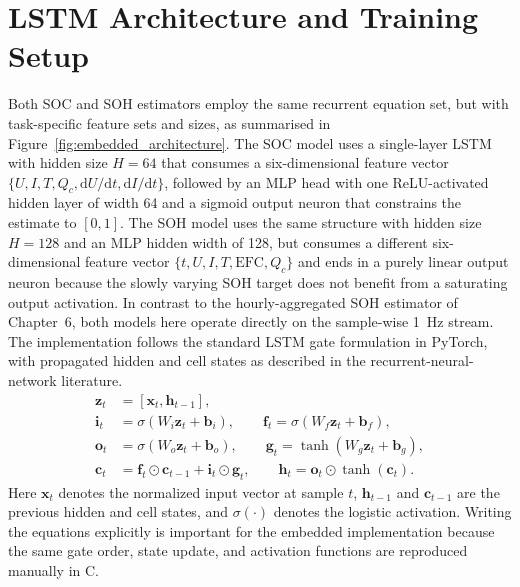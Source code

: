 \documentclass[
    a4paper,
    12pt,
    titlepage,
    bibliography=totoc,
    twoside=on,
    parskip=false,
    numbers=noenddot,
    cleardoublepage=empty,
    DIV=12,
    BCOR=12.0mm,
    headheight=36pt,
    headings=openright
]{scrreprt}
\begin{document}
\section{LSTM Architecture and Training Setup}
Both SOC and SOH estimators employ the same recurrent equation set, but with task-specific feature sets and sizes, as summarised in Figure~\ref{fig:embedded_architecture}. The SOC model uses a single-layer LSTM with hidden size $H=64$ that consumes a six-dimensional feature vector $\{U,I,T,Q_c,\mathrm{d}U/\mathrm{d}t,\mathrm{d}I/\mathrm{d}t\}$, followed by an MLP head with one ReLU-activated hidden layer of width 64 and a sigmoid output neuron that constrains the estimate to $[0,1]$. The SOH model uses the same structure with hidden size $H=128$ and an MLP hidden width of 128, but consumes a different six-dimensional feature vector $\{t,U,I,T,\mathrm{EFC},Q_c\}$ and ends in a purely linear output neuron because the slowly varying SOH target does not benefit from a saturating output activation. In contrast to the hourly-aggregated SOH estimator of Chapter~6, both models here operate directly on the sample-wise \SI{1}{\hertz} stream. The implementation follows the standard LSTM gate formulation in PyTorch, with propagated hidden and cell states as described in the recurrent-neural-network literature.\autocite{liptonCriticalReviewRecurrent2015,paszkePyTorchImperativeStyle2019}
\begin{align}
    \mathbf{z}_t &= [\mathbf{x}_t,\mathbf{h}_{t-1}],\\
    \mathbf{i}_t &= \sigma(W_i\mathbf{z}_t+\mathbf{b}_i), \qquad
    \mathbf{f}_t = \sigma(W_f\mathbf{z}_t+\mathbf{b}_f), \nonumber\\
    \mathbf{o}_t &= \sigma(W_o\mathbf{z}_t+\mathbf{b}_o), \qquad
    \mathbf{g}_t = \tanh(W_g\mathbf{z}_t+\mathbf{b}_g), \nonumber\\
    \mathbf{c}_t &= \mathbf{f}_t\odot\mathbf{c}_{t-1}+\mathbf{i}_t\odot\mathbf{g}_t,\qquad
    \mathbf{h}_t = \mathbf{o}_t\odot\tanh(\mathbf{c}_t). \nonumber
\end{align}
Here $\mathbf{x}_t$ denotes the normalized input vector at sample $t$, $\mathbf{h}_{t-1}$ and $\mathbf{c}_{t-1}$ are the previous hidden and cell states, and $\sigma(\cdot)$ denotes the logistic activation. Writing the equations explicitly is important for the embedded implementation because the same gate order, state update, and activation functions are reproduced manually in C.
\end{document}
